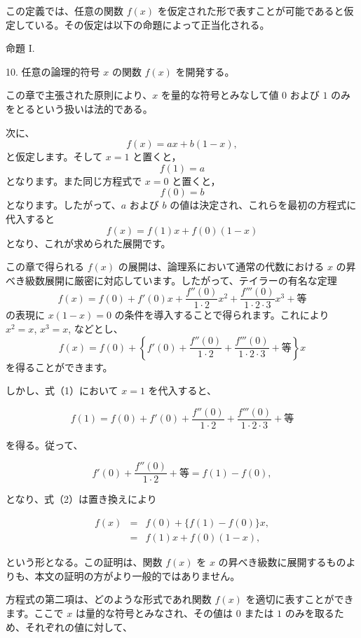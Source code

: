 \documentclass[a4paper,11pt,openany]{ltjsbook}
\begin{document}
この定義では、任意の関数 \( f(x) \) を仮定された形で表すことが可能であると仮定している。その仮定は以下の命題によって正当化される。

\begin{center}
\textsc{命題 I.}
\end{center}

10. 任意の論理的符号 \( x \) の関数 \( f(x) \) を開発する。

この章で主張された原則により、\( x \) を量的な符号とみなして値 \( 0 \) および \( 1 \) のみをとるという扱いは法的である。

次に、
\[
f(x) = ax + b (1 - x),
\]
と仮定します。そして $x = 1$ と置くと，
\[
f(1) = a
\]
となります。また同じ方程式で $x = 0$ と置くと，
\[
f(0) = b
\]
となります。したがって、$a$ および $b$ の値は決定され、これらを最初の方程式に代入すると
\begin{equation}
f(x) = f(1)x + f(0)(1-x)
\end{equation}
となり、これが求められた展開です。

この章で得られる $f(x)$ の展開は、論理系において通常の代数における $x$ の昇べき級数展開に厳密に対応しています。したがって、テイラーの有名な定理
\[
f(x) = f(0) + f'(0)x + \frac{f''(0)}{1 \cdot 2} x^2 + \frac{f'''(0)}{1 \cdot 2 \cdot 3} x^3 + 等
\]
の表現に $x (1 - x) = 0$ の条件を導入することで得られます。これにより $x^2 = x$, $x^3 = x$, などとし、
\begin{equation}
f(x) = f(0) + \left\{ f'(0) + \frac{f''(0)}{1 \cdot 2} + \frac{f'''(0)}{1 \cdot 2 \cdot 3} + 等 \right\} x
\end{equation}
を得ることができます。

しかし、式（1）において \( x = 1 \) を代入すると、

\[
f(1) = f(0) + f'(0) + \frac{f''(0)}{1 \cdot 2} +
\frac{f'''(0)}{1 \cdot 2 \cdot 3} + \textrm{等}
\]

を得る。従って、

\[
f'(0) + \frac{f''(0)}{1 \cdot 2} + \textrm{等} = f(1) - f(0),
\]

となり、式（2）は置き換えにより

\begin{eqnarray*}
f(x) &=& f(0) + \{f(1)-f(0)\} x,\\
     &=& f(1)x + f(0)(1-x),
\end{eqnarray*}

という形となる。この証明は、関数 \( f(x) \) を \( x \) の昇べき級数に展開するものよりも、本文の証明の方がより一般的ではありません。

方程式の第二項は、どのような形式であれ関数 \( f(x) \) を適切に表すことができます。ここで \( x \) は量的な符号とみなされ、その値は \( 0 \) または \( 1 \) のみを取るため、それぞれの値に対して、
\end{document}

